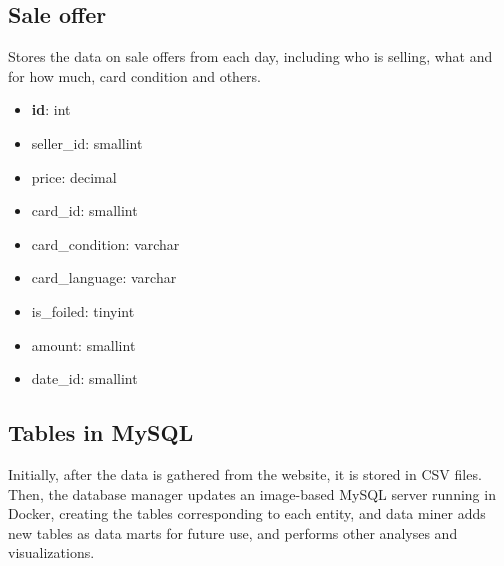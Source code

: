 \subsection{Sale offer}
Stores the data on sale offers from each day, including who is selling, what and for how much, card condition and others.
\begin{itemize}
\setlength\itemsep{0.2em}
\item \textbf{id}: int
\item seller\_id: smallint
\item price: decimal
\item card\_id: smallint
\item card\_condition: varchar
\item card\_language: varchar
\item is\_foiled: tinyint
\item amount: smallint
\item date\_id: smallint
\end{itemize}

\subsection{Tables in MySQL}
Initially, after the data is gathered from the website, it is stored in CSV files. Then, the database manager updates an image-based MySQL server running in Docker, creating the tables corresponding to each entity, and data miner adds new tables as data marts for future use, and performs other analyses and visualizations.